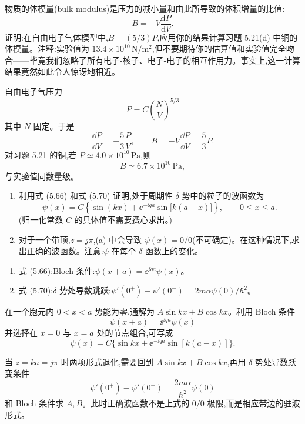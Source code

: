 \begin{question}
物质的体模量(bulk modulus)是压力的减小量和由此所导致的体积增量的比值:
\[
B=-V\frac{\mathrm dP}{\mathrm dV}.
\]
证明:在自由电子气体模型中,$B=(5/3)P$,应用你的结果计算习题 5.21(d) 中铜的体模量。注释:实验值为 $13.4\times10^{10}\,\mathrm{N/m^2}$,但不要期待你的估算值和实验值完全吻合——毕竟我们忽略了所有电子-核子、电子-电子的相互作用力。事实上,这一计算结果竟然如此令人惊讶地相近。
\begin{solution}

自由电子气压力
\[
P=C\left(\frac NV\right)^{5/3}
\]
其中 $N$ 固定。于是
\[
\frac{\dd P}{\dd V}=-\frac53\frac{P}{V},
\qquad
B=-V\frac{\dd P}{\dd V}=\frac53P.
\]
对习题 5.21 的铜,若 $P\simeq4.0\times10^{10}\,\mathrm{Pa}$,则
\[
B\simeq6.7\times10^{10}\,\mathrm{Pa},
\]
与实验值同数量级。

\end{solution}
\end{question}

\begin{question}
\begin{enumerate}
\item 利用式 (5.66) 和式 (5.70) 证明,处于周期性 $\delta$ 势中的粒子的波函数为
\[
\psi(x)=C\left\{\sin(kx)+\ee^{-\ii qa}\sin\bigl[k(a-x)\bigr]\right\},\qquad 0\le x\le a.
\]
(归一化常数 $C$ 的具体值不需要费心求出。)
\item 对于一个带顶,$z=j\pi$,(a) 中会导致 $\psi(x)=0/0$(不可确定)。在这种情况下,求出正确的波函数。注意:$\psi$ 在每个 $\delta$ 函数上的变化。
\end{enumerate}

\par\smallskip
{}
\begin{enumerate}[leftmargin=2.2em,itemsep=0.12em,topsep=0.12em,parsep=0pt]
\item 式 (5.66):Bloch 条件:$\psi(x+a)=\ee^{\ii qa}\psi(x)$。
\item 式 (5.70):$\delta$ 势处导数跳跃:$\psi'(0^+)-\psi'(0^-)=2m\alpha\psi(0)/\hbar^2$。
\end{enumerate}

\begin{solution}

在一个胞元内 $0<x<a$ 势能为零,通解为 $A\sin kx+B\cos kx$。利用 Bloch 条件
\[
\psi(x+a)=\ee^{\ii qa}\psi(x)
\]
并选择在 $x=0$ 与 $x=a$ 处的节点组合,可写成
\[
\psi(x)=C\{\sin kx+\ee^{-\ii qa}\sin[k(a-x)]\}.
\]

当 $z=ka=j\pi$ 时两项形式退化,需要回到 $A\sin kx+B\cos kx$,再用 $\delta$ 势处导数跃变条件
\[
\psi'(0^+)-\psi'(0^-)=\frac{2m\alpha}{\hbar^2}\psi(0)
\]
和 Bloch 条件求 $A,B$。此时正确波函数不是上式的 $0/0$ 极限,而是相应带边的驻波形式。

\end{solution}
\end{question}

